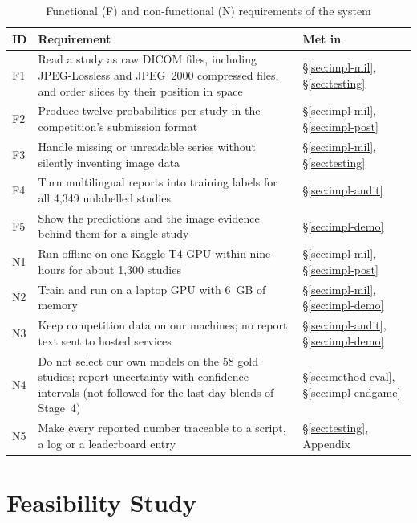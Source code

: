 \begin{table}[htbp]
\centering\footnotesize{}
\caption{Functional (F) and non-functional (N) requirements of the system}
\label{tab:requirements}
\begin{tabularx}{\textwidth}{l Y L{2.4cm}}
\toprule
ID & Requirement & Met in \\
\midrule
F1 & Read a study as raw DICOM files, including JPEG-Lossless and JPEG~2000 compressed files, and order slices by their position in space & \S\ref{sec:impl-mil}, \S\ref{sec:testing} \\
F2 & Produce twelve probabilities per study in the competition's submission format & \S\ref{sec:impl-mil}, \S\ref{sec:impl-post} \\
F3 & Handle missing or unreadable series without silently inventing image data & \S\ref{sec:impl-mil}, \S\ref{sec:testing} \\
F4 & Turn multilingual reports into training labels for all 4,349 unlabelled studies & \S\ref{sec:impl-audit} \\
F5 & Show the predictions and the image evidence behind them for a single study & \S\ref{sec:impl-demo} \\
N1 & Run offline on one Kaggle T4 GPU within nine hours for about 1,300 studies & \S\ref{sec:impl-mil}, \S\ref{sec:impl-post} \\
N2 & Train and run on a laptop GPU with 6~GB of memory & \S\ref{sec:impl-mil}, \S\ref{sec:impl-demo} \\
N3 & Keep competition data on our machines; no report text sent to hosted services & \S\ref{sec:impl-audit}, \S\ref{sec:impl-demo} \\
N4 & Do not select our own models on the 58 gold studies; report uncertainty with confidence intervals (not followed for the last-day blends of Stage~4) & \S\ref{sec:method-eval}, \S\ref{sec:impl-endgame} \\
N5 & Make every reported number traceable to a script, a log or a leaderboard entry & \S\ref{sec:testing}, Appendix \\
\bottomrule
\end{tabularx}
\end{table}

\section{Feasibility Study}

